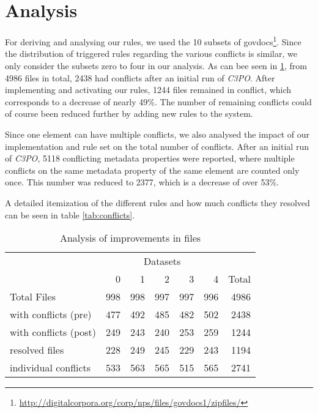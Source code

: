 \documentclass[a4paper,12pt]{article}
\begin{document}
\section{Analysis}

For deriving and analysing our rules, we used the 10 subsets of govdocs\footnote{\url{http://digitalcorpora.org/corp/nps/files/govdocs1/zipfiles/}}.
Since the distribution of triggered rules regarding the various conflicts is similar, we only consider the subsets zero to four in our analysis.
As can bee seen in \ref{tab:files}, from 4986 files in total, 2438 had conflicts after an initial run of \emph{C3PO}. After implementing and activating our rules, 1244 files remained in conflict, which corresponds to a decrease of nearly 49\%. The number of remaining conflicts could of course been reduced further by adding new rules to the system.

Since one element can have multiple conflicts, we also analysed the impact of our implementation and rule set on the total number of conflicts.
After an initial run of \emph{C3PO}, 5118 conflicting metadata properties were reported, where multiple conflicts on the same metadata property of the same element are counted only once. This number was reduced to 2377, which is a decrease of over 53\%.

A detailed itemization of the different rules and how much conflicts they resolved can be seen in table \ref{tab:conflicts}.

\begin{table}[ht]
\begin{center}

\begin{tabular}[h]{l||r|r|r|r|r||r}
 &  \multicolumn{5}{c}{Datasets} \\
        & 0 & 1 & 2 & 3 & 4 & Total \\
\hline
Total Files & 998 & 998 & 997 & 997 & 996 & 4986\\ 
\hline
with conflicts (pre) & 477 &	492 & 485 & 482	& 502 &	2438\\ 
with conflicts (post) & 249	& 243 &	240 & 253 &	259 & 1244\\
\hline
resolved files & 228 & 249 & 245 & 229 & 243 & 1194 \\
individual conflicts & 533 & 563 & 565 & 515 & 565 & 2741 \\


\end{tabular}
\end{center}
\caption{Analysis of improvements in files}
\label{tab:files}
\end{table}
\end{document}
